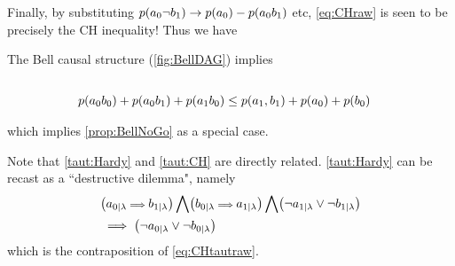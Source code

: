 Finally, by substituting $\p{a_0 \nb_1} \to \p{a_0}-\p{a_0 b_1}$ etc, \cref{eq:CHraw} is seen to be precisely the CH inequality! Thus we have
\begin{prop} \label{prop:CH}
The Bell causal structure (\cref{fig:BellDAG}) implies
\begin{align*}
\\&\p{a_0 b_0} +\p{a_0 b_1} + \p{a_1 b_0} \leq \p{a_1,b_1} +\p{a_0} + \p{b_0}
\end{align*}
\end{prop}
\noindent which implies \cref{prop:BellNoGo} as a special case.


Note that \cref{taut:Hardy} and \cref{taut:CH} are directly related. \cref{taut:Hardy} can be recast as a ``destructive dilemma", namely
\begin{align}\begin{split}
&\parens*{a_{0|\lambda} {\scriptstyle \implies}  b_{1|\lambda}} \bigwedge \parens*{b_{0|\lambda} {\scriptstyle \implies}  a_{1|\lambda}} \bigwedge \parens*{\na_{1|\lambda} \lor \nb_{1|\lambda}}\\ &\implies \parens*{\na_{0|\lambda} \lor \nb_{0|\lambda}}
\end{split}\end{align}
which is the contraposition of \cref{eq:CHtautraw}.


